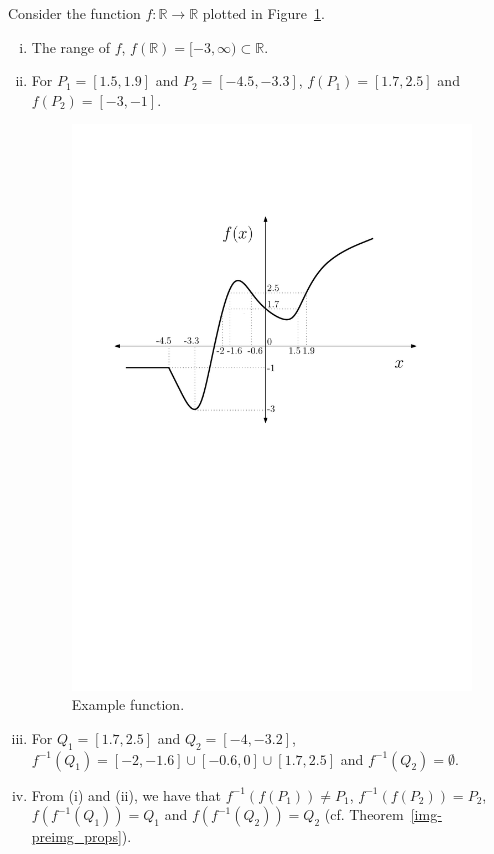 \documentclass[a4paper,english,12pt]{article}
\begin{document}
\begin{exmp}
Consider the function $f:\mathbb{R}\rightarrow \mathbb{R}$ plotted in Figure~\ref{func_ex}.\begin{enumerate}[i)]
\item The range of $f$, $f(\mathbb{R})=[-3,\infty)\subset \mathbb{R}$.
\item For $P_1=[1.5,1.9]$ and $P_2=[-4.5,-3.3]$, $f(P_1)=[1.7,2.5]$ and $f(P_2)=[-3,-1]$.
\begin{figure}[h]
\centering
\includegraphics[scale=0.6]{Figures/l5f2_graph.pdf}
\caption{Example function.}
\label{func_ex}
\end{figure}
\item For $Q_1=[1.7,2.5]$ and $Q_2=[-4,-3.2]$, $f^{-1}(Q_1)= [-2,-1.6] \cup [-0.6,0] \cup [1.7,2.5]$ and $f^{-1}(Q_2)=\emptyset$.
\item From (i) and (ii), we have that $f^{-1}(f(P_1))\neq P_1$, $f^{-1}(f(P_2))=P_2$, $f(f^{-1}(Q_1))=Q_1$ and $f(f^{-1}(Q_2))=Q_2$ (cf. Theorem~\ref{img-preimg_props}).
\end{enumerate}
\end{exmp}
\end{document}

